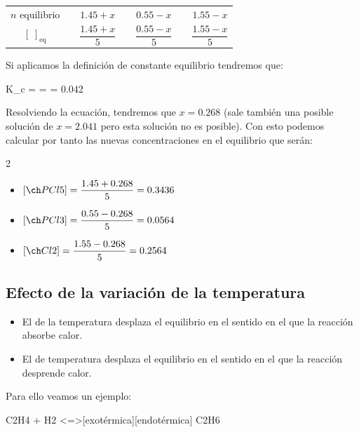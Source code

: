 \begin{example}
\begin{table}[H]
\begin{tabular}{@{}c @{\,}c@{\,} c @{\,}c@{\,} c @{\,}c@{\,} c@{}}
            $ n $ equilibrio &  & $ 1.45+x $ &  & $ 0.55 -x $ &  & $ 1.55-x $ \\[3pt]
            \([\; ]_{\text{eq}}\) &  & \(\dfrac{1.45+x}{5} \) &  & \(\dfrac{0.55 -x}{5} \) &  & \(\dfrac{1.55-x}{5} \) \\
            \bottomrule
        \end{tabular}
    \end{table}
    Si aplicamos la definición de constante equilibrio tendremos que:
    \begin{centeredequation}
        K_c =  =  = 0.042
    \end{centeredequation}
    Resolviendo la ecuación, tendremos que \(x=0.268\) (sale también una posible solución de \(x=2.041\) pero esta solución no es posible).
    Con esto podemos calcular por tanto las nuevas concentraciones en el equilibrio que serán:
    \begin{multicols}{2}
        \begin{itemize}
            \item \(\conc{PCl5}= \dfrac{1.45 + 0.268}{5} = 0.3436 \)
            \item \(\conc{PCl3} =\dfrac{0.55 - 0.268}{5} = 0.0564 \)
            \item \(\conc{Cl2} = \dfrac{1.55 - 0.268}{5} = 0.2564\)
        \end{itemize}
    \end{multicols}

\end{example}

\subsection{Efecto de la variación de la temperatura}\label{subsec:efecto-de-la-variacion-de-la-temperatura}

\begin{itemize}
    \item El  de la temperatura desplaza el equilibrio en el sentido en el que la reacción absorbe calor.
    \item El  de temperatura desplaza el equilibrio en el sentido en el que la reacción desprende calor.
\end{itemize}
Para ello veamos un ejemplo:

\begin{reaction}
    C2H4 \gas{} + H2 \gas{}  <=>[exotérmica][endotérmica] C2H6 \gas{} \label{rxn:hidrogenacionEteno}
\end{reaction}

